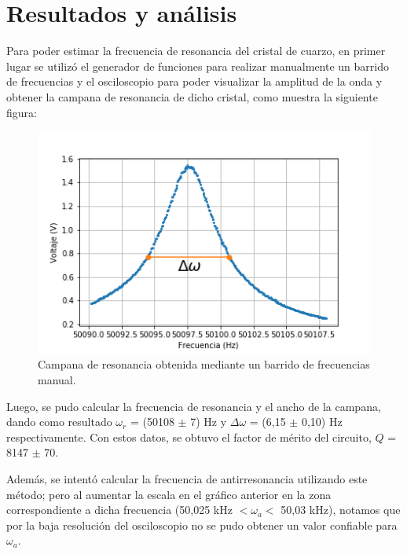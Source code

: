 \documentclass[twoside,twocolumn,a4paper]{article}
\begin{document}
\section{Resultados y an\'alisis}

Para poder estimar la frecuencia de resonancia del cristal de cuarzo, en primer lugar se utiliz\'o el generador de funciones para realizar manualmente un barrido de frecuencias y el osciloscopio para poder visualizar la amplitud de la onda y obtener la campana de resonancia de dicho cristal, como muestra la siguiente figura:

\begin{figure}[H]
\includegraphics[width=\linewidth]{detallecampanaOSC.png}
\caption{Campana de resonancia obtenida mediante un barrido de frecuencias manual.}
\label{fig:detallecampanaOSC}
\end{figure}

Luego, se pudo calcular la frecuencia de resonancia y el ancho de la campana, dando como resultado $\omega_{r}$ = (50108 $\pm$ 7) Hz y $\Delta \omega$ = (6,15 $\pm$ 0,10) Hz respectivamente. Con estos datos, se obtuvo el factor de m\'erito del circuito, $Q$ = 8147 $\pm$ 70. \newline

\par
Adem\'as, se intent\'o calcular la frecuencia de antirresonancia utilizando este m\'etodo; pero al aumentar la escala en el gr\'afico anterior en la zona correspondiente a dicha frecuencia (50,025 kHz $< \omega_{a} <$ 50,03 kHz), notamos que por la baja resoluci\'on del osciloscopio no se pudo obtener un valor confiable para $\omega_{a}$. \newline
\end{document}
